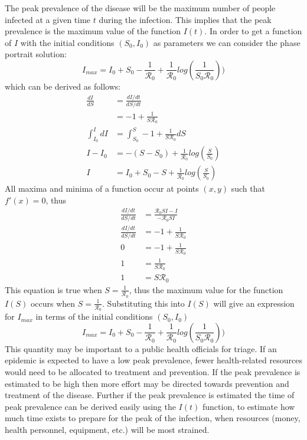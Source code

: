 
The peak prevalence of the disease will be the maximum number of people infected at a given time $t$ during the infection.
This implies that the peak prevalence is the maximum value of the function $I(t)$.
In order to get a function of $I$ with the initial conditions $(S_0,I_0)$ as parameters we can consider the phase portrait solution:
$$ I_{max} = I_0 + S_0 - \frac{1}{\mathcal R_0} + \frac{1}{\mathcal R_0}log(\frac{1}{S_0\mathcal R_0}))$$
which can be derived as follows:
\begin{align*}
    \frac{dI}{dS}     &= \frac{dI/dt}{dS/dt}\\
                      &= -1 + \frac{1}{S\mathcal R_0}\\
    \int_{I_0}^{I} dI &= \int_{S_0}^{S} -1 + \frac{1}{S\mathcal R_0}dS\\
    I - I_0           &= -(S - S_0) + \frac{1}{\mathcal R_0}log(\frac{S}{S_0})\\
    I                 &= I_0 + S_0 - S + \frac{1}{\mathcal R_0}log(\frac{S}{S_0})
\end{align*}
All maxima and minima of a function occur at points $(x,y)$ such that $f'(x) = 0$, thus
\begin{align*}
    \frac{dI/dt}{dS/dt} &= \frac{{\mathcal R_0}SI - I}{-\mathcal R_0SI}\\
    \frac{dI/dt}{dS/dt} &= -1 + \frac{1}{S\mathcal R_0}\\
    0                   &= -1 + \frac{1}{S\mathcal R_0}\\
    1                   &= \frac{1}{S\mathcal R_0}\\
    1                   &= S{\mathcal R_0}
\end{align*}
This equation is true when $S = \frac{1}{\mathcal R_0}$, thus the maximum value for the function $I(S)$ occurs when $S = \frac{1}{\mathcal R_0}$.
Substituting this into $I(S)$ will give an expression for $I_{max}$ in terms of the initial conditions $(S_0,I_0)$
$$ I_{max} = I_0 + S_0 - \frac{1}{\mathcal R_0} + \frac{1}{\mathcal R_0}log(\frac{1}{S_0\mathcal R_0}))$$
This quantity may be important to a public health officials for triage. If an epidemic is expected to have a low peak prevalence, fewer health-related resources would need to be allocated to treatment and prevention.
If the peak prevalence is estimated to be high then more effort may be directed towards prevention and treatment of the disease.
Further if the peak prevalence is estimated the time of peak prevalence can be derived easily using the $I(t)$ function, to estimate how much time exists to prepare for the peak of the infection, when resources (money, health personnel, equipment, etc.) will be most strained.
